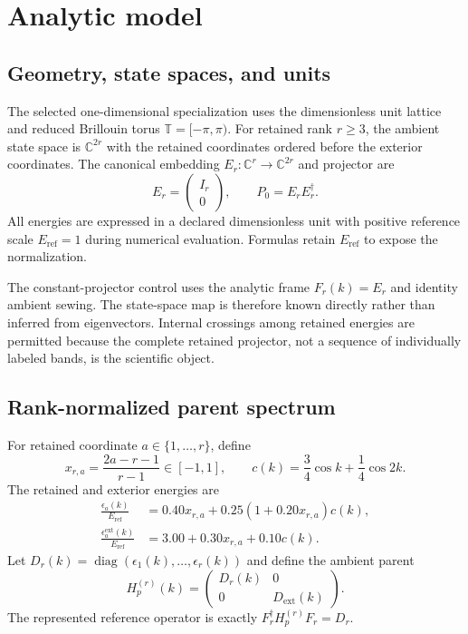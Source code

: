 \documentclass[11pt]{article}
\newcommand{\Torus}{\mathbb T}
\newcommand{\Eref}{E_{\mathrm{ref}}}
\begin{document}
\section{Analytic model}
\label{sec:model}

\subsection{Geometry, state spaces, and units}

The selected one-dimensional specialization uses the dimensionless unit lattice and reduced
Brillouin torus $\Torus=[-\pi,\pi)$. For retained rank $r\geq3$, the ambient state space
is $\mathbb C^{2r}$ with the retained coordinates ordered before the exterior
coordinates. The canonical embedding $E_r:\mathbb C^r\rightarrow\mathbb C^{2r}$ and
projector are
\begin{equation}
 E_r=\begin{pmatrix}I_r\\0\end{pmatrix},
 \qquad P_0=E_rE_r^\dagger.
\end{equation}
All energies are expressed in a declared dimensionless unit with positive reference
scale $\Eref=1$ during numerical evaluation. Formulas retain $\Eref$ to expose the
normalization.

The constant-projector control uses the analytic frame $F_r(k)=E_r$ and identity ambient sewing.
The state-space map is therefore known directly rather than inferred from eigenvectors.
Internal crossings among retained energies are permitted because the complete retained
projector, not a sequence of individually labeled bands, is the scientific object.

\subsection{Rank-normalized parent spectrum}

For retained coordinate $a\in\{1,\ldots,r\}$, define
\begin{equation}
 x_{r,a}=\frac{2a-r-1}{r-1}\in[-1,1],
 \qquad
 c(k)=\frac34\cos k+\frac14\cos 2k.
\end{equation}
The retained and exterior energies are
\begin{align}
 \frac{\epsilon_a(k)}{\Eref}
 &=0.40x_{r,a}+0.25\left(1+0.20x_{r,a}\right)c(k),
 \label{eq:retained-energy}\\
 \frac{\epsilon_a^{\mathrm{ext}}(k)}{\Eref}
 &=3.00+0.30x_{r,a}+0.10c(k).
 \label{eq:exterior-energy}
\end{align}
Let $D_r(k)=\operatorname{diag}(\epsilon_1(k),\ldots,\epsilon_r(k))$ and define the
ambient parent
\begin{equation}
 H_p^{(r)}(k)=
 \begin{pmatrix}D_r(k)&0\\0&D_{\mathrm{ext}}(k)\end{pmatrix}.
 \label{eq:parent-hamiltonian}
\end{equation}
The represented reference operator is exactly $F_r^\dagger H_p^{(r)}F_r=D_r$.
\end{document}

